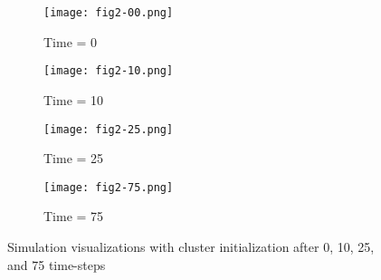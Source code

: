 \begin{figure}[h!]
  \centering
  \begin{subfigure}{0.24\textwidth}
    \centering
    \texttt{[image: fig2-00.png]}
    \caption{Time = 0}
  \end{subfigure}
  \begin{subfigure}{0.24\textwidth}
    \centering
    \texttt{[image: fig2-10.png]}
    \caption{Time = 10}
  \end{subfigure}
  \begin{subfigure}{0.24\textwidth}
    \centering
    \texttt{[image: fig2-25.png]}
    \caption{Time = 25}
  \end{subfigure}
  \begin{subfigure}{0.24\textwidth}
    \centering
    \texttt{[image: fig2-75.png]}
    \caption{Time = 75}
  \end{subfigure}
  
  \caption{Simulation visualizations with cluster initialization after
    0, 10, 25, and 75 time-steps}
  \label{fig:visuals}
\end{figure}
